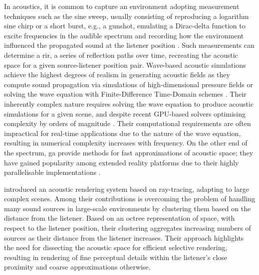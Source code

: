 In acoustics, it is common to capture an environment adopting measurement techniques such as the sine sweep, usually consisting of reproducing a logarithm sine chirp or a short burst, e.g., a gunshot,  emulating a Dirac-delta function to excite frequencies in the audible spectrum and recording how the environment influenced the propagated sound at the listener position \citep{reilly1995convolution}. Such measurements can determine a \acrfull{rir}, a series of reflection paths over time, recreating the acoustic space for a given source-listener position pair. Wave-based acoustic simulations achieve the highest degrees of realism in generating acoustic fields as they compute sound propagation via simulations of high-dimensional pressure fields \citep{raghuvanshi2014parametric} or solving the wave equation with Finite-Difference Time-Domain schemes \citep{hamilton2017fdtd}. Their inherently complex nature requires solving the wave equation to produce acoustic simulations for a given scene, and despite recent GPU-based solvers optimising complexity by orders of magnitude \citep{mehra2012efficient}. Their computational requirements are often impractical for real-time applications due to the nature of the wave equation, resulting in numerical complexity increases with frequency. On the other end of the spectrum, \acrfull{ga} provide methods for fast approximations of acoustic space; they have gained popularity among extended reality platforms due to their highly parallelisable implementations \citep{savioja2015overview}.\par
\cite{schissler2016interactive} introduced an acoustic rendering system based on ray-tracing, adapting to large complex scenes. Among their contributions is overcoming the problem of handling many sound sources in large-scale environments by clustering them based on the distance from the listener. Based on an octree representation of space, with respect to the listener position, their clustering aggregates increasing numbers of sources as their distance from the listener increases. Their approach highlights the need for dissecting the acoustic space for efficient selective rendering, resulting in rendering of fine perceptual details within the listener's close proximity and coarse approximations otherwise.\par

